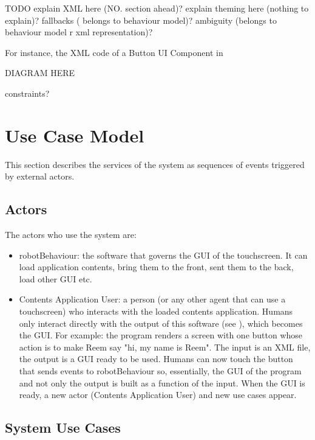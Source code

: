TODO explain XML here (NO. section ahead)? explain theming here (nothing to explain)? fallbacks ( belongs to behaviour model)? ambiguity (belongs to behaviour model r xml representation)?

For instance, the \ac{XML} code of a Button UI Component in 



DIAGRAM HERE

constraints?
\FloatBarrier

\section{Use Case Model}
This section describes the services of the system as sequences of events triggered by external actors.

\subsection{Actors}
The actors who use the system are:
\begin{itemize}
	\item robotBehaviour: the software that governs the \ac{GUI} of the touchscreen. It can load application contents, bring them to the front, sent them to the back, load other \ac{GUI} etc.
	\item Contents Application User: a person (or any other agent that can use a touchscreen) who interacts with the loaded contents application. Humans only interact directly with the output of this software (see ), which becomes the \ac{GUI}.
For example: the program renders a screen with one button whose action is to make Reem say "hi, my name is Reem".
The input is an \ac{XML} file, the output is a \ac{GUI} ready to be used.
Humans can now touch the button that sends events to robotBehaviour so, essentially, the \ac{GUI} of the program and not only the output is built as a function of the input.
When the \ac{GUI} is ready, a new actor (Contents Application User) and new use cases appear.
\end{itemize}


\subsection{System Use Cases}

